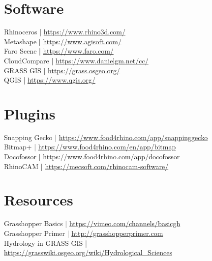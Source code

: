 \documentclass[11pt,article,oneside]{memoir}
\begin{document}
\section{Software}

Rhinoceros | \url{https://www.rhino3d.com/}\\
Metashape | \url{https://www.agisoft.com/}\\
Faro Scene | \url{https://www.faro.com/}\\
CloudCompare | \url{https://www.danielgm.net/cc/}\\
GRASS GIS | \url{https://grass.osgeo.org/}\\
QGIS | \url{https://www.qgis.org/}\\

\section{Plugins}
Snapping Gecko | \url{https://www.food4rhino.com/app/snappinggecko}\\
Bitmap+ | \url{https://www.food4rhino.com/en/app/bitmap}\\
Docofossor | \url{https://www.food4rhino.com/app/docofossor}\\
RhinoCAM | \url{https://mecsoft.com/rhinocam-software/}\\

\section{Resources}

Grasshopper Basics | \url{https://vimeo.com/channels/basicgh}\\
Grasshopper Primer | \url{http://grasshopperprimer.com}\\
Hydrology in GRASS GIS | \url{https://grasswiki.osgeo.org/wiki/Hydrological_Sciences}\\
\end{document}
